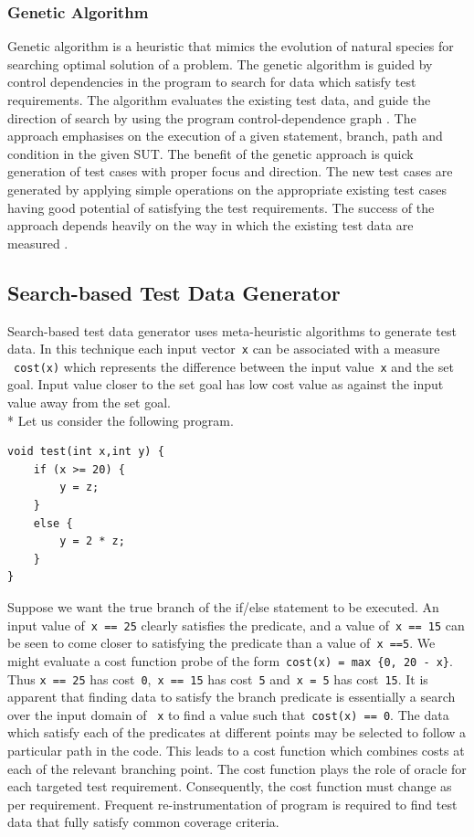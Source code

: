 \subsubsection{Genetic Algorithm}
Genetic algorithm is a heuristic that mimics the evolution of natural species for searching optimal solution of a problem. The genetic algorithm is guided by control dependencies in the program to search for data which satisfy test requirements. The algorithm evaluates the existing test data, and guide the direction of search by using the program control-dependence graph \cite{pargas1999test}. The approach emphasises on the execution of a given statement, branch, path and condition in the given SUT. The benefit of the genetic approach is quick generation of test cases with proper focus and direction. The new test cases are generated by applying simple operations on the appropriate existing test cases having good potential of satisfying the test requirements. The success of the approach depends heavily on the way in which the existing test data are measured \cite{pargas1999test}.


\subsection{Search-based Test Data Generator} \label{sec:search_based_2}
Search-based test data generator uses meta-heuristic algorithms to generate test data. In this technique each input vector~\verb+x+ can be associated with a measure ~\verb+cost(x)+ which represents the difference between the input value~\verb+x+ and the set goal. Input value closer to the set goal has low cost value as against the input value away from the set goal. \\*
Let us consider the following program.


\begin{lstlisting}
void test(int x,int y) {
	if (x >= 20) {
		y = z; 
	}
	else {
		y = 2 * z;
	}
}
\end{lstlisting}

Suppose we want the true branch of the if/else statement to be executed. An input value of~\verb+x == 25+ clearly satisfies the predicate, and a value of~\verb+x == 15+ can be seen to come closer to satisfying the predicate than a value of~\verb+x ==5+. We might evaluate a cost function probe of the form~\verb+cost(x) = max {0, 20 - x}+. Thus \verb+x == 25+ has cost~\verb+0+,~\verb+x == 15+ has cost~\verb+5+ and~\verb+x = 5+ has cost~\verb+15+. It is apparent that finding data to satisfy the branch predicate is essentially a search over the input domain of ~\verb+x+ to find a value such that~\verb+cost(x) == 0+. The data which satisfy each of the predicates at different points may be selected to follow a particular path in the code. This leads to a cost function which combines costs at each of the relevant branching point. The cost function plays the role of oracle for each targeted test requirement. Consequently, the cost function must change as per requirement. Frequent re-instrumentation of program is required to find test data that fully satisfy common coverage criteria. 

